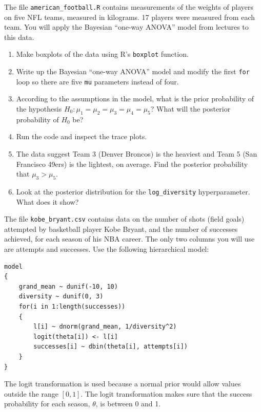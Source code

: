 \documentclass[12pt]{article}
\makeatletter
\def\BackgroundEPS#1#2#3#4{%
    \special{ps: @beginspecial @setspecial initmatrix
                0.9 setgray #2 #3 translate #4 dup scale}
    \special{ps: plotfile #1}
    \special{ps: @endspecial}
}
\makeatother
\begin{document}
\makeband


\begin{Questions}
\item The file {\tt american\_football.R} contains measurements of the weights
of players on five NFL teams, measured in kilograms. 17 players were measured
from each team. You will apply the Bayesian ``one-way ANOVA'' model from lectures
to this data.

\begin{enumerate}
\item Make boxplots of the data using R's {\tt boxplot} function.
\item Write up the Bayesian ``one-way ANOVA'' model and modify the
first {\tt for} loop so there are five {\tt mu} parameters instead of four.
\item According to the assumptions in the model, what is the prior probability
of the hypothesis $H_0: \mu_1 = \mu_2 = \mu_3 = \mu_4 = \mu_5$? What will the
posterior probability of $H_0$ be?
\item Run the code and inspect the trace plots.
\item The data suggest Team 3 (Denver Broncos)
is the heaviest and Team 5 (San Francisco 49ers) is the lightest, on average.
Find the posterior probability that $\mu_3 > \mu_5$.
\item Look at the posterior distribution for the {\tt log\_diversity}
hyperparameter. What does it show?
\end{enumerate}


\item
The file {\tt kobe\_bryant.csv} contains data on the number of shots
(field goals) attempted by basketball player Kobe Bryant, and the number of successes achieved, for each season of his NBA career.
The only two columns you will use are attempts and successes. Use the following hierarchical
model:
\begin{verbatim}
model
{
    grand_mean ~ dunif(-10, 10)
    diversity ~ dunif(0, 3)
    for(i in 1:length(successes))
    {
        l[i] ~ dnorm(grand_mean, 1/diversity^2)
        logit(theta[i]) <- l[i]
        successes[i] ~ dbin(theta[i], attempts[i])
    }
}
\end{verbatim}

The logit transformation is used because a normal prior would allow values
outside the range $[0, 1]$. The logit transformation makes sure that
the success probability for each season, $\theta$, is between 0 and 1.


\end{Questions}
\end{document}
